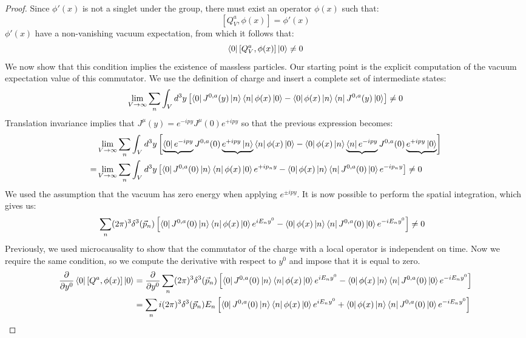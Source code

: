\documentclass[../main.tex]{subfiles}
\begin{document}
\begin{proof}
 Since $\phi'(x)$ is not a singlet under the group, there must exist an operator $\phi(x)$ such that:
\[
[Q_V^a,\phi(x)]=\phi'(x)
\]
$\phi'(x)$ have a non-vanishing vacuum expectation, from which it follows that:
\[
\bra{0}[Q_V^a,\phi(x)]\ket{0}\neq0
\]
We now show that this condition implies the existence of massless particles. Our starting point is the explicit computation of the vacuum expectation value of this commutator. We use the definition of charge and insert a complete set of intermediate states:
\[
\lim_{V\to\infty}\sum_n\int_V d^3y\left[\bra{0}J^{0,a}(y)\ket{n}\bra{n}\phi(x)\ket{0}-\bra{0}\phi(x)\ket{n}\bra{n}J^{0,a}(y)\ket{0}\right]\neq0
\]
Translation invariance implies that $J^\mu(y)=e^{-ipy}J^\mu(0)e^{+ipy}$ so that the previous expression becomes:
\begin{align*}
&\lim_{V\to\infty}\sum_n\int_V d^3y\left[\underbrace{\bra{0}e^{-ipy}}J^{0,a}(0)\underbrace{e^{+ipy}\ket{n}}\bra{n}\phi(x)\ket{0}-\bra{0}\phi(x)\ket{n}\underbrace{\bra{n}e^{-ipy}}J^{0,a}(0)\underbrace{e^{+ipy}\ket{0}}\right]\\
=&\lim_{V\to\infty}\sum_n\int_V d^3y\left[\bra{0}J^{0,a}(0)\ket{n}\bra{n}\phi(x)\ket{0}e^{+ip_ny}-\bra{0}\phi(x)\ket{n}\bra{n}J^{0,a}(0)\ket{0}e^{-ip_ny}\right]\neq0
\end{align*}
We used the assumption that the vacuum has zero energy when applying $e^{\pm ipy}$. It is now possible to perform the spatial integration, which gives us:
\begin{align*}
&\sum_n(2\pi)^3\delta^3(\Vec{p}_n)\left[\bra{0}J^{0,a}(0)\ket{n}\bra{n}\phi(x)\ket{0}e^{iE_ny^0}-\bra{0}\phi(x)\ket{n}\bra{n}J^{0,a}(0)\ket{0}e^{-iE_ny^0}\right]\neq0
\end{align*}
Previously, we used microcausality to show that the commutator of the charge with a local operator is independent on time. Now we require the same condition, so we compute the derivative with respect to $y^0$ and impose that it is equal to zero.
\begin{align*}
\frac{\partial}{\partial y^0}\bra{0}[Q^a,\phi(x)]\ket{0}&=\frac{\partial}{\partial y^0}\sum_n(2\pi)^3\delta^3(\Vec{p}_n)\left[\bra{0}J^{0,a}(0)\ket{n}\bra{n}\phi(x)\ket{0}e^{iE_ny^0}-\bra{0}\phi(x)\ket{n}\bra{n}J^{0,a}(0)\ket{0}e^{-iE_ny^0}\right]\\
&=\sum_ni(2\pi)^3\delta^3(\Vec{p}_n)E_n\left[\bra{0}J^{0,a}(0)\ket{n}\bra{n}\phi(x)\ket{0}e^{iE_ny^0}+\bra{0}\phi(x)\ket{n}\bra{n}J^{0,a}(0)\ket{0}e^{-iE_ny^0}\right]

\end{align*}
\end{proof}
\end{document}
